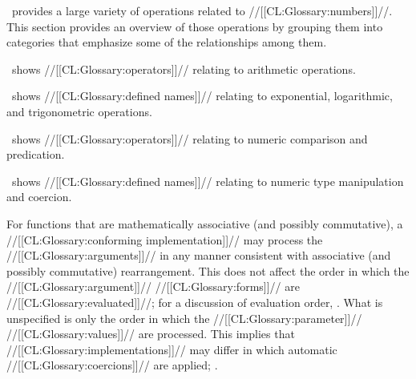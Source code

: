 


\clisp\ provides a large variety of operations related to //[[CL:Glossary:numbers]]//.
This section provides an overview of those operations by grouping them
into categories that emphasize some of the relationships among them.

\Thenextfigure\ shows //[[CL:Glossary:operators]]// relating to
arithmetic operations.


\Thenextfigure\ shows //[[CL:Glossary:defined names]]// relating to
exponential, logarithmic, and trigonometric operations.


\Thenextfigure\ shows //[[CL:Glossary:operators]]// relating to
numeric comparison and predication.


\Thenextfigure\ shows //[[CL:Glossary:defined names]]// relating to
numeric type manipulation and coercion.



For functions that are mathematically associative (and possibly commutative),
a //[[CL:Glossary:conforming implementation]]// may process the //[[CL:Glossary:arguments]]// in any manner 
consistent with associative (and possibly commutative) rearrangement.  This does not
affect the order in which the //[[CL:Glossary:argument]]// //[[CL:Glossary:forms]]// are //[[CL:Glossary:evaluated]]//;
for a discussion of evaluation order, \seesection\FunctionForms.
What is unspecified is only the order in which the //[[CL:Glossary:parameter]]// //[[CL:Glossary:values]]//
are processed.  This implies that //[[CL:Glossary:implementations]]// may differ in which 
automatic //[[CL:Glossary:coercions]]// are applied; \seesection\NumericContagionRules.

